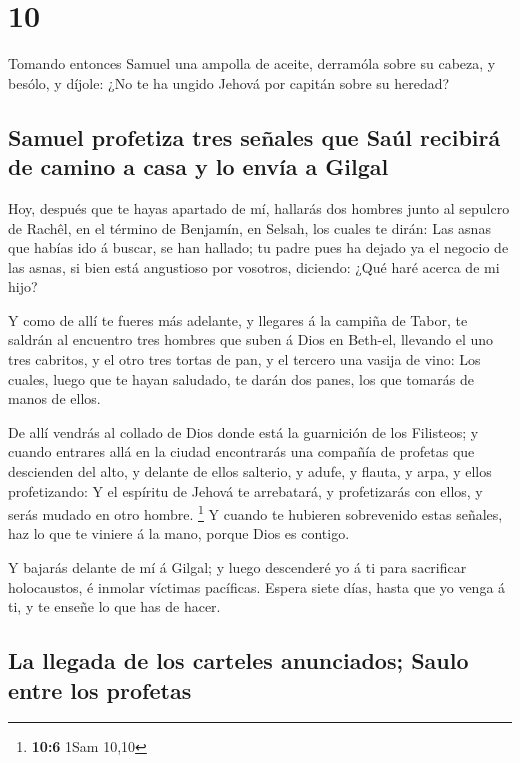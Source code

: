 \hypertarget{section-9}{%
\section{10}\label{section-9}}

 Tomando entonces Samuel una ampolla de aceite, derramóla
sobre su cabeza, y besólo, y díjole: ¿No te ha ungido Jehová por capitán
sobre su heredad?

\hypertarget{samuel-profetiza-tres-seuxf1ales-que-sauxfal-recibiruxe1-de-camino-a-casa-y-lo-envuxeda-a-gilgal}{%
\subsection{Samuel profetiza tres señales que Saúl recibirá de camino a
casa y lo envía a
Gilgal}\label{samuel-profetiza-tres-seuxf1ales-que-sauxfal-recibiruxe1-de-camino-a-casa-y-lo-envuxeda-a-gilgal}}

 Hoy, después que te hayas apartado de mí, hallarás dos
hombres junto al sepulcro de Rachêl, en el término de Benjamín, en
Selsah, los cuales te dirán: Las asnas que habías ido á buscar, se han
hallado; tu padre pues ha dejado ya el negocio de las asnas, si bien
está angustioso por vosotros, diciendo: ¿Qué haré acerca de mi hijo?

 Y como de allí te fueres más adelante, y llegares á la
campiña de Tabor, te saldrán al encuentro tres hombres que suben á Dios
en Beth-el, llevando el uno tres cabritos, y el otro tres tortas de pan,
y el tercero una vasija de vino:  Los cuales, luego que te
hayan saludado, te darán dos panes, los que tomarás de manos de ellos.

 De allí vendrás al collado de Dios donde está la
guarnición de los Filisteos; y cuando entrares allá en la ciudad
encontrarás una compañía de profetas que descienden del alto, y delante
de ellos salterio, y adufe, y flauta, y arpa, y ellos profetizando:
 Y el espíritu de Jehová te arrebatará, y profetizarás con
ellos, y serás mudado en otro hombre. \footnote{\textbf{10:6} 1Sam 10,10}
 Y cuando te hubieren sobrevenido estas señales, haz lo
que te viniere á la mano, porque Dios es contigo.

 Y bajarás delante de mí á Gilgal; y luego descenderé yo á
ti para sacrificar holocaustos, é inmolar víctimas pacíficas. Espera
siete días, hasta que yo venga á ti, y te enseñe lo que has de hacer.

\hypertarget{la-llegada-de-los-carteles-anunciados-saulo-entre-los-profetas}{%
\subsection{La llegada de los carteles anunciados; Saulo entre los
profetas}\label{la-llegada-de-los-carteles-anunciados-saulo-entre-los-profetas}}

